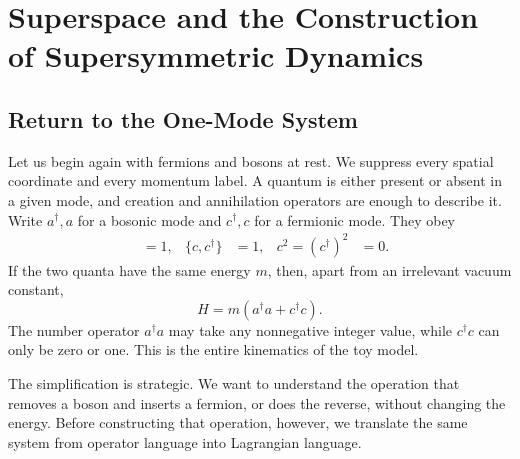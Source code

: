 \chapter{Superspace and the Construction of Supersymmetric Dynamics}


\section{Return to the One-Mode System}

Let us begin again with fermions and bosons at rest. We suppress every spatial coordinate and every momentum label. A quantum is either present or absent in a given mode, and creation and annihilation operators are enough to describe it. Write \(a^\dagger,a\) for a bosonic mode and \(c^\dagger,c\) for a fermionic mode. They obey
\begin{align}
[a,a^\dagger]&=1,
&
\{c,c^\dagger\}&=1,
&
c^2=(c^\dagger)^2&=0.
\end{align}
If the two quanta have the same energy \(m\), then, apart from an irrelevant vacuum constant,
\begin{equation}
H=m\left(a^\dagger a+c^\dagger c\right).
\label{eq:l7-one-mode-hamiltonian}
\end{equation}
The number operator \(a^\dagger a\) may take any nonnegative integer value, while \(c^\dagger c\) can only be zero or one. This is the entire kinematics of the toy model.

The simplification is strategic. We want to understand the operation that removes a boson and inserts a fermion, or does the reverse, without changing the energy. Before constructing that operation, however, we translate the same system from operator language into Lagrangian language.

